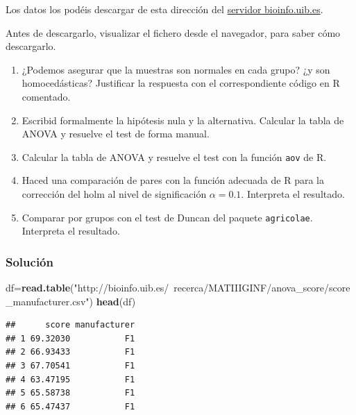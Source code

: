 \documentclass[
]{article}
\newenvironment{Shaded}{\begin{snugshade}}{\end{snugshade}}
\newcommand{\KeywordTok}[1]{\textcolor[rgb]{0.13,0.29,0.53}{\textbf{#1}}}
\newcommand{\NormalTok}[1]{#1}
\newcommand{\OperatorTok}[1]{\textcolor[rgb]{0.81,0.36,0.00}{\textbf{#1}}}
\newcommand{\StringTok}[1]{\textcolor[rgb]{0.31,0.60,0.02}{#1}}
\providecommand{\tightlist}{%
  \setlength{\itemsep}{0pt}\setlength{\parskip}{0pt}}
\begin{document}
Los datos los podéis descargar de esta dirección del
\href{http://bioinfo.uib.es/~recerca/MATIIIGINF/anova_score/}{servidor
bioinfo.uib.es}.

Antes de descargarlo, visualizar el fichero desde el navegador, para
saber cómo descargarlo.

\begin{enumerate}
\def\labelenumi{\arabic{enumi}.}
\tightlist
\item
  ¿Podemos asegurar que la muestras son normales en cada grupo? ¿y son
  homocedásticas? Justificar la respuesta con el correspondiente código
  en R comentado.
\item
  Escribid formalmente la hipótesis nula y la alternativa. Calcular la
  tabla de ANOVA y resuelve el test de forma manual.
\item
  Calcular la tabla de ANOVA y resuelve el test con la función
  \texttt{aov} de R.
\item
  Haced una comparación de pares con la función adecuada de R para la
  corrección del holm al nivel de significación \(\alpha=0.1\).
  Interpreta el resultado.
\item
  Comparar por grupos con el test de Duncan del paquete
  \texttt{agricolae}. Interpreta el resultado.
\end{enumerate}

\hypertarget{soluciuxf3n-2}{%
\subsubsection{Solución}\label{soluciuxf3n-2}}

\begin{Shaded}
\begin{Highlighting}[]
\NormalTok{df=}\KeywordTok{read.table}\NormalTok{(}\StringTok{"http://bioinfo.uib.es/~recerca/MATIIIGINF/anova_score/score_manufacturer.csv"}\NormalTok{)}
\KeywordTok{head}\NormalTok{(df)}
\end{Highlighting}
\end{Shaded}

\begin{verbatim}
##      score manufacturer
## 1 69.32030           F1
## 2 66.93433           F1
## 3 67.70541           F1
## 4 63.47195           F1
## 5 65.58738           F1
## 6 65.47437           F1
\end{verbatim}

\begin{Shaded}
\end{Shaded}
\end{document}
